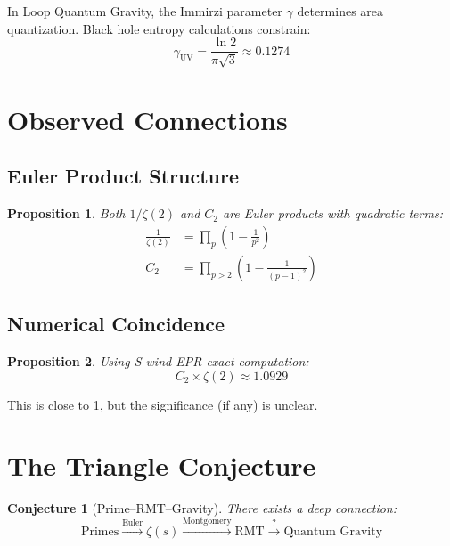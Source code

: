 \documentclass[11pt,a4paper]{article}
\newtheorem{proposition}{Proposition}
\newtheorem{conjecture}{Conjecture}
\begin{document}
In Loop Quantum Gravity, the Immirzi parameter $\gamma$ determines area quantization. Black hole entropy calculations constrain:
\begin{equation}
\gamma_{\text{UV}} = \frac{\ln 2}{\pi\sqrt{3}} \approx 0.1274
\end{equation}

\section{Observed Connections}

\subsection{Euler Product Structure}

\begin{proposition}
Both $1/\zeta(2)$ and $C_2$ are Euler products with quadratic terms:
\begin{align}
\frac{1}{\zeta(2)} &= \prod_p \left(1 - \frac{1}{p^2}\right) \\
C_2 &= \prod_{p>2} \left(1 - \frac{1}{(p-1)^2}\right)
\end{align}
\end{proposition}

\subsection{Numerical Coincidence}

\begin{proposition}
Using S-wind EPR exact computation:
\begin{equation}
C_2 \times \zeta(2) \approx 1.0929
\end{equation}
\end{proposition}

This is close to 1, but the significance (if any) is unclear.

\section{The Triangle Conjecture}

\begin{conjecture}[Prime--RMT--Gravity]
There exists a deep connection:
\begin{equation}
\text{Primes} \xrightarrow{\text{Euler}} \zeta(s) \xrightarrow{\text{Montgomery}} \text{RMT} \xrightarrow{?} \text{Quantum Gravity}
\end{equation}
\end{conjecture}
\end{document}
